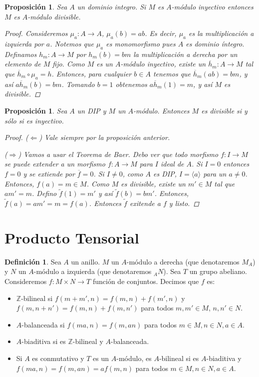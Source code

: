 \documentclass[12pt]{book}
\newtheorem{prop}[teo]{Proposición}
\theoremstyle{definition}
\newtheorem{defn}[teo]{Definición}
\newcommand{\ZZ}{\mathbb{Z}}      %
\begin{document}
\begin{prop}
Sea $A$ un dominio integro. Si $M$ es $A$-módulo inyectivo entonces $M$ es $A$-módulo divisible.
\begin{proof}

Consideremos $\mu_a:A\to A$, $\mu_a(b)=ab$. Es decir, $\mu_a$ es la multiplicación a izquierda por $a$. Notemos que $\mu_a$ es monomorfismo pues $A$ es dominio íntegro. Definamos $h_m:A\to M$ por $h_m(b)=bm$ la multiplicación a derecha por un elemento de $M$ fijo. Como $M$ es un $A$-módulo inyectivo, existe un $\overline{h}_m:A\to M$ tal que $\overline{h}_m\circ\mu_a = h$. Entonces, para cualquier $b\in A$ tenemos que $\overline{h}_m(ab)=bm$, y así $a\overline{h}_m(b)=bm$. Tomando $b=1$ obtenemos $a\overline{h}_m(1)=m$, y así $M$ es divisible.

\end{proof}
\end{prop}

\begin{prop}
Sea $A$ un DIP y $M$ un $A$-módulo. Entonces $M$ es divisible si y sólo si es inyectivo.
\begin{proof}
($\Longleftarrow$) Vale siempre por la proposición anterior.

($\Longrightarrow$) Vamos a usar el Teorema de Baer. Debo ver que todo morfismo $f:I\to M$ se puede extender a un morfismo $f:A\to M$ para $I$ ideal de $A$. Si $I=0$ entonces $f=0$ y se extiende por $\overline{f}=0$. Si $I\neq 0$, como $A$ es DIP, $I=\langle a\rangle$ para un $a\neq 0$. Entonces, $f(a)=m\in M$. Como $M$ es divisible, existe un $m'\in M$ tal que $am'=m$. Defino $\tilde{f}(1)=m'$ y así $\tilde{f}(b)=bm'$. Entonces, $\tilde{f}(a)=am'=m=f(a)$. Entonces $\tilde{f}$ exitende a $f$ y listo.
\end{proof}
\end{prop}

\section{Producto Tensorial}

\begin{defn}
Sea $A$ un anillo. $M$ un $A$-módulo a derecha (que denotaremos $M_A$) y $N$ un $A$-módulo a izquierda (que denotaremos $_AN$). Sea $T$ un grupo abeliano. Consideremos $f: M\times N\to T$ función de conjuntos. Decimos que $f$ es: \begin{itemize}\item $\ZZ$-bilineal si $f(m+m',n) = f(m,n)+f(m',n)$ y $f(m,n+n')=f(m,n)+f(m,n')$ para todos $m,m'\in M$, $n,n'\in N$. \item $A$-balanceada si $f(ma,n)=f(m,an)$ para todos $m\in M, n\in N, a\in A$. \item $A$-biaditiva si es $\ZZ$-bilineal y $A$-balanceada. \item Si $A$ es conmutativo y $T$ es un $A$-módulo, es $A$-bilineal si es $A$-biaditiva y $f(ma,n)=f(m,an)=af(m,n)$ para todos $m\in M,n\in N, a\in A$.\end{itemize}
\end{defn}
\end{document}
